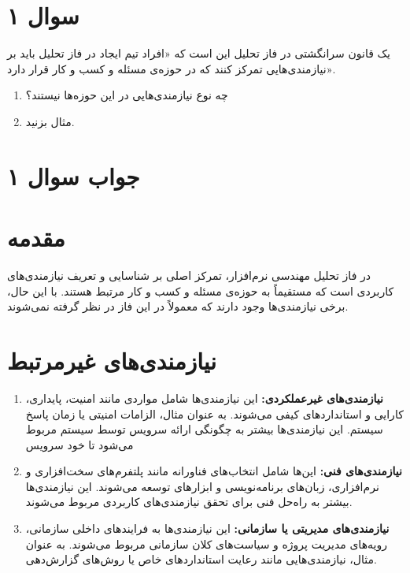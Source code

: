 \section*{سوال ۱}

یک قانون سرانگشتی در فاز تحلیل این است که «افراد تیم ایجاد در فاز تحلیل باید بر نیازمندی‌هایی تمرکز کنند که در حوزه‌ی مسئله و کسب و کار قرار دارد».
\begin{enumerate}
	\item چه نوع نیازمندی‌هایی در این حوزه‌ها نیستند؟
	\item مثال بزنید.
\end{enumerate}

\section*{جواب سوال ۱}


\section*{مقدمه}
در فاز تحلیل مهندسی نرم‌افزار، تمرکز اصلی بر شناسایی و تعریف نیازمندی‌های کاربردی است که مستقیماً به حوزه‌ی مسئله و کسب و کار مرتبط هستند. با این حال، برخی نیازمندی‌ها وجود دارند که معمولاً در این فاز در نظر گرفته نمی‌شوند.

\section*{نیازمندی‌های غیرمرتبط}
\begin{enumerate}
	
	\item \textbf{نیازمندی‌های غیرعملکردی:} این نیازمندی‌ها شامل مواردی مانند امنیت، پایداری، کارایی و استانداردهای کیفی می‌شوند. به عنوان مثال، الزامات امنیتی یا زمان پاسخ سیستم. این نیازمندی‌ها بیشتر به چگونگی ارائه سرویس توسط سیستم مربوط می‌شود تا خود سرویس
	
	\item \textbf{نیازمندی‌های فنی:} این‌ها شامل انتخاب‌های فناورانه مانند پلتفرم‌های سخت‌افزاری و نرم‌افزاری، زبان‌های برنامه‌نویسی و ابزارهای توسعه می‌شوند. این نیازمندی‌ها بیشتر به راه‌حل فنی برای تحقق نیازمندی‌های کاربردی مربوط می‌شوند.
	
	\item \textbf{نیازمندی‌های مدیریتی یا سازمانی:} این نیازمندی‌ها به فرایندهای داخلی سازمانی، رویه‌های مدیریت پروژه و سیاست‌های کلان سازمانی مربوط می‌شوند. به عنوان مثال، نیازمندی‌هایی مانند رعایت استانداردهای خاص یا روش‌های گزارش‌دهی.
	
\end{enumerate}

